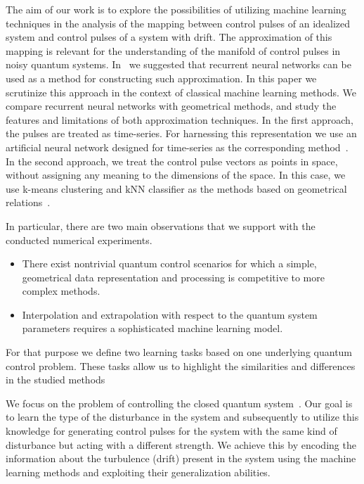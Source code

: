 \documentclass[aps,pra,showkeys,showpacs,notitlepage,superscriptaddress]{revtex4-1}
\newcommand{\1}{{\rm 1\hspace{-0.9mm}l}}
\newcommand{\kNN}{\ensuremath{\mathrm{kNN}}\xspace}
\begin{document}
The aim of our work is to explore the possibilities of utilizing machine 
learning techniques in the analysis of the mapping between control pulses
of an idealized system and control pulses of a system with drift. The 
approximation of this mapping is relevant for the understanding of the 
manifold of control pulses in noisy quantum systems. 
In~\cite{ostaszewski18approximation} we suggested that recurrent neural 
networks can be used as a method for constructing such approximation.
In this paper we scrutinize this approach in the context of classical machine 
learning methods. We compare recurrent neural networks with geometrical 
methods, and study the features and limitations of both approximation techniques.
In the first approach, the pulses are treated as time-series.
For harnessing this representation we use an artificial neural network designed
for time-series as the corresponding method~\cite{hochreiter1997long}. In the 
second approach, we treat the control pulse vectors as points in space, 
without assigning any meaning to the dimensions of the space. In this case, we 
use k-means clustering and \kNN classifier as the methods based on geometrical 
relations~\cite{kNN}.


In particular, there are two main observations that we support with the 
conducted numerical experiments.
\begin{itemize}
   	\item There exist nontrivial quantum control scenarios for which 
   	a simple, geometrical data representation and processing is competitive 
   	to more complex methods.
   	\item Interpolation and extrapolation with respect to the quantum system parameters requires a sophisticated machine learning model.
\end{itemize}
For that purpose we define two learning tasks based on one underlying quantum
control problem. These tasks allow us to highlight the similarities and
differences in the studied methods




We focus on the problem of controlling the closed quantum 
system~\cite{breuer2002theory}. Our goal is to learn the type of the 
disturbance in the system and subsequently to utilize this knowledge for 
generating control pulses for the system with the same kind of disturbance but 
acting with a different strength. We achieve this by encoding the information 
about the turbulence (drift) present in the system using the machine learning 
methods and exploiting their generalization abilities.
\end{document}
